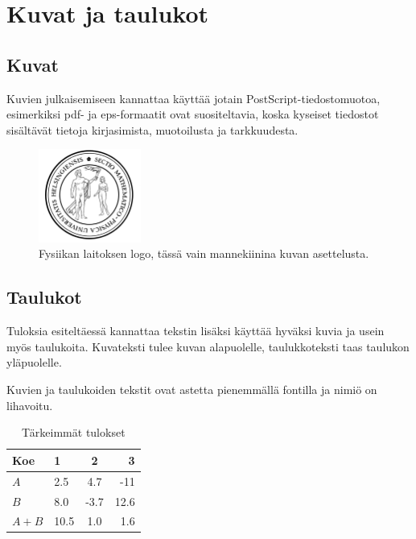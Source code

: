 \documentclass[finnish,twoside,openright]{HYgradu}
\begin{document}
\chapter{Kuvat ja taulukot}

\section{Kuvat}
Kuvien julkaisemiseen kannattaa k\"aytt\"a\"a  jotain PostScript-tiedostomuotoa, esimerkiksi pdf- ja eps-formaatit ovat suositeltavia, koska kyseiset tiedostot sis\"alt\"av\"at tietoja kirjasimista, muotoilusta ja tarkkuudesta.

\begin{figure}[h!] 
\centering %
\includegraphics[width=0.3\textwidth]{sinetti.png}
\caption{Fysiikan laitoksen logo, t\"ass\"a vain mannekiinina kuvan asettelusta.}
\label{fig:sinetti}
\end{figure}

\section{Taulukot}

Tuloksia esitelt\"aess\"a kannattaa tekstin lis\"aksi k\"aytt\"a\"a hyv\"aksi kuvia ja usein my\"os taulukoita. Kuvateksti tulee kuvan alapuolelle, taulukkoteksti taas taulukon  yl\"apuolelle.

Kuvien ja taulukoiden tekstit ovat astetta pienemm\"all\"a fontilla ja nimi\"o on lihavoitu.

\begin{table}
\centering
\caption{T\"arkeimm\"at tulokset}
\label{tab:symbols}
\begin{tabular}{l||l c r} %
Koe & 1 & 2 & 3 \\ 
\hline \hline %
$A$ & 2.5 & 4.7 & -11 \\
$B$ & 8.0 & -3.7 & 12.6 \\
$A+B$ & 10.5 & 1.0 & 1.6 \\
\hline
%
\end{tabular}
\end{table}
\end{document}
